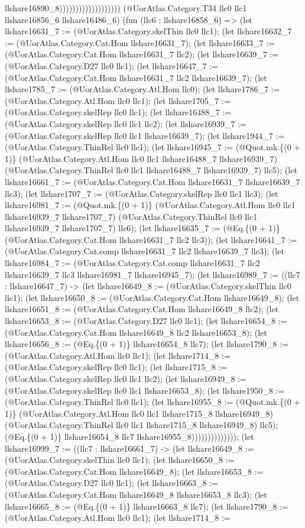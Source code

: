 \documentclass[11pt]{article}
\begin{document}
llshare16890\_8))))))))))))))))))) (@UorAtlas.Category.T34 llc0 llc1 llshare16856\_6 llshare16486\_6) (fun (llc6 : llshare16858\_6) => (let llshare16631\_7 := (@UorAtlas.Category.skelThin llc0 llc1); (let llshare16632\_7 := (@UorAtlas.Category.Cat.Hom llshare16631\_7); (let llshare16633\_7 := (@UorAtlas.Category.Cat.Hom llshare16631\_7 llc2); (let llshare16639\_7 := (@UorAtlas.Category.D27 llc0 llc1); (let llshare16647\_7 := (@UorAtlas.Category.Cat.Hom llshare16631\_7 llc2 llshare16639\_7); (let llshare1785\_7 := (@UorAtlas.Category.Atl.Hom llc0); (let llshare1786\_7 := (@UorAtlas.Category.Atl.Hom llc0 llc1); (let llshare1705\_7 := (@UorAtlas.Category.skelRep llc0 llc1); (let llshare16488\_7 := (@UorAtlas.Category.skelRep llc0 llc1 llc2); (let llshare16939\_7 := (@UorAtlas.Category.skelRep llc0 llc1 llshare16639\_7); (let llshare1944\_7 := (@UorAtlas.Category.ThinRel llc0 llc1); (let llshare16945\_7 := (@Quot.mk.\{(0 + 1)\} (@UorAtlas.Category.Atl.Hom llc0 llc1 llshare16488\_7 llshare16939\_7) (@UorAtlas.Category.ThinRel llc0 llc1 llshare16488\_7 llshare16939\_7) llc5); (let llshare16661\_7 := (@UorAtlas.Category.Cat.Hom llshare16631\_7 llshare16639\_7 llc3); (let llshare1707\_7 := (@UorAtlas.Category.skelRep llc0 llc1 llc3); (let llshare16981\_7 := (@Quot.mk.\{(0 + 1)\} (@UorAtlas.Category.Atl.Hom llc0 llc1 llshare16939\_7 llshare1707\_7) (@UorAtlas.Category.ThinRel llc0 llc1 llshare16939\_7 llshare1707\_7) llc6); (let llshare16635\_7 := (@Eq.\{(0 + 1)\} (@UorAtlas.Category.Cat.Hom llshare16631\_7 llc2 llc3)); (let llshare16641\_7 := (@UorAtlas.Category.Cat.comp llshare16631\_7 llc2 llshare16639\_7 llc3); (let llshare16984\_7 := (@UorAtlas.Category.Cat.comp llshare16631\_7 llc2 llshare16639\_7 llc3 llshare16981\_7 llshare16945\_7); (let llshare16989\_7 := ((llc7 : llshare16647\_7) -> (let llshare16649\_8 := (@UorAtlas.Category.skelThin llc0 llc1); (let llshare16650\_8 := (@UorAtlas.Category.Cat.Hom llshare16649\_8); (let llshare16651\_8 := (@UorAtlas.Category.Cat.Hom llshare16649\_8 llc2); (let llshare16653\_8 := (@UorAtlas.Category.D27 llc0 llc1); (let llshare16654\_8 := (@UorAtlas.Category.Cat.Hom llshare16649\_8 llc2 llshare16653\_8); (let llshare16656\_8 := (@Eq.\{(0 + 1)\} llshare16654\_8 llc7); (let llshare1790\_8 := (@UorAtlas.Category.Atl.Hom llc0 llc1); (let llshare1714\_8 := (@UorAtlas.Category.skelRep llc0 llc1); (let llshare1715\_8 := (@UorAtlas.Category.skelRep llc0 llc1 llc2); (let llshare16949\_8 := (@UorAtlas.Category.skelRep llc0 llc1 llshare16653\_8); (let llshare1950\_8 := (@UorAtlas.Category.ThinRel llc0 llc1); (let llshare16955\_8 := (@Quot.mk.\{(0 + 1)\} (@UorAtlas.Category.Atl.Hom llc0 llc1 llshare1715\_8 llshare16949\_8) (@UorAtlas.Category.ThinRel llc0 llc1 llshare1715\_8 llshare16949\_8) llc5); (@Eq.\{(0 + 1)\} llshare16654\_8 llc7 llshare16955\_8)))))))))))))); (let llshare16999\_7 := ((llc7 : llshare16661\_7) -> (let llshare16649\_8 := (@UorAtlas.Category.skelThin llc0 llc1); (let llshare16650\_8 := (@UorAtlas.Category.Cat.Hom llshare16649\_8); (let llshare16653\_8 := (@UorAtlas.Category.D27 llc0 llc1); (let llshare16663\_8 := (@UorAtlas.Category.Cat.Hom llshare16649\_8 llshare16653\_8 llc3); (let llshare16665\_8 := (@Eq.\{(0 + 1)\} llshare16663\_8 llc7); (let llshare1790\_8 := (@UorAtlas.Category.Atl.Hom llc0 llc1); (let llshare1714\_8 := 
\end{document}
